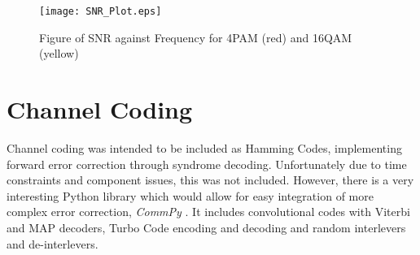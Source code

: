 \documentclass[../main.tex]{subfiles}
\begin{document}
\begin{figure}[ht]
	\centering
	\texttt{[image: SNR\_Plot.eps]}	
	\caption{Figure of SNR against Frequency for 4PAM (red) and 16QAM (yellow)}
	\label{fig_4PAM SNR}
\end{figure}



\section{Channel Coding} \label{sec_Channel Coding}

Channel coding was intended to be included as Hamming Codes, implementing forward error correction through syndrome decoding.
Unfortunately due to time constraints and component issues, this was not included.
However, there is a very interesting Python library which would allow for easy integration of more complex error correction, \textit{CommPy} \cite{lib_CommPy}.
It includes convolutional codes with Viterbi and MAP decoders, Turbo Code encoding and decoding and random interlevers and de-interlevers.
\end{document}
